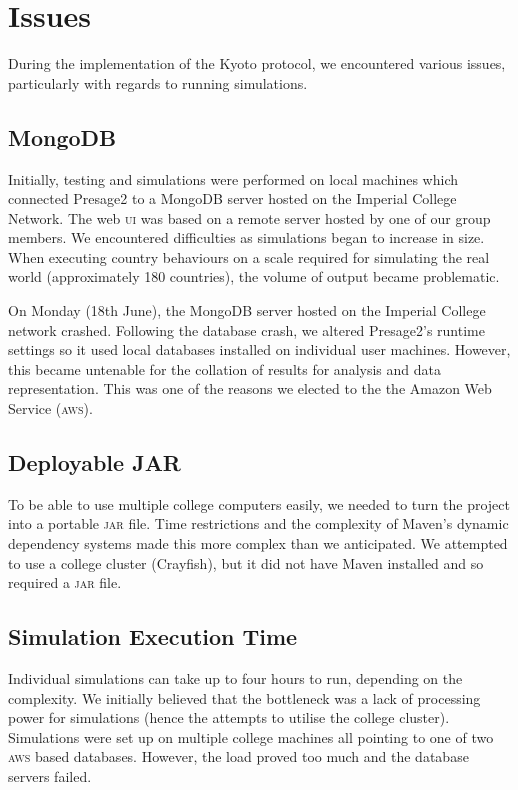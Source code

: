 
\section{Issues}

During the implementation of the Kyoto protocol, we encountered various issues, particularly with regards to running simulations.

\subsection{MongoDB}

Initially, testing and simulations were performed on local machines which connected Presage2 to a MongoDB server hosted on the Imperial College Network. The web \textsc{ui} was based on a remote server hosted by one of our group members. We encountered difficulties as simulations began to increase in size. When executing country behaviours on a scale required for simulating the real world (approximately 180 countries), the volume of output became problematic.

On Monday (18th June), the MongoDB server hosted on the Imperial College network crashed. Following the database crash, we altered Presage2's runtime settings so it used local databases installed on individual user machines. However, this became untenable for the collation of results for analysis and data representation. This was one of the reasons we elected to the the Amazon Web Service (\textsc{aws}).

\subsection{Deployable JAR}

To be able to use multiple college computers easily, we needed to turn the project into a portable \textsc{jar} file. Time restrictions and the complexity of Maven's dynamic dependency systems made this more complex than we anticipated.  We attempted to use a college cluster (Crayfish), but it did not have Maven installed and so required a \textsc{jar} file.

\subsection{Simulation Execution Time}

Individual simulations can take up to four hours to run, depending on the complexity. We initially believed that the bottleneck was a lack of processing power for simulations (hence the attempts to utilise the college cluster).  Simulations were set up on multiple college machines all pointing to one of two \textsc{aws} based databases.  However, the load proved too much and the database servers failed.

